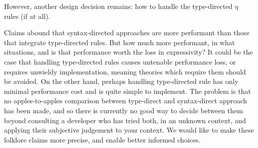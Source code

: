 

However, another design decision remains: how to handle the type-directed $\eta$ rules (if at all).

Claims abound that syntax-directed approaches are more performant than those that integrate type-directed rules.
But how much more performant, in what situations, and is that performance worth the loss in expressivity?
It could be the case that handling type-directed rules causes untenable performance loss, or requires unwieldy implementation, meaning theories which require them should be avoided.
On the other hand, perhaps handling type-directed rule has only minimal performance cost and is quite simple to implement.
The problem is that no apples-to-apples comparison between type-direct and syntax-direct approach has been made, and so there is currently no good way to decide between them beyond consulting a developer who has tried both, in an unknown context, and applying their subjective judgement to your context.
We would like to make these folklore claims more precise, and enable better informed choices.

%

